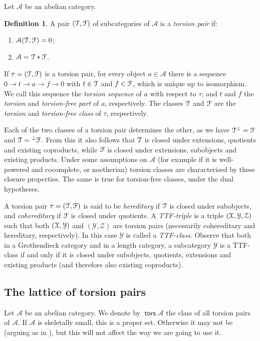 \documentclass[a4paper,11pt]{amsart}
\theoremstyle{plain}
\theoremstyle{definition}
\newtheorem{dfn}[thm]{Definition}
\newcommand{\Acal}{\mathcal{A}} \newcommand{\Bcal}{\mathcal{B}} \newcommand{\Ccal}{\mathcal{C}}
\newcommand{\Ycal}{\mathcal{Y}} \newcommand{\Zcal}{\mathcal{Z}}
\DeclareMathOperator{\tors}{\mathsf{tors}}
\begin{document}
Let $\Acal$ be an abelian category.

\begin{dfn}
	A pair $(\mathcal{T},\mathcal{F})$ of subcategories of $\Acal$ is a \emph{torsion pair} if:
	\begin{enumerate}
		\item $\Acal(\Tcal,\Fcal)=0$;
		\item $\Acal=\Tcal\ast\Fcal$.
	\end{enumerate}
\end{dfn}

If $\tau=(\mathcal{T},\mathcal{F})$ is a torsion pair, for every object $a\in\Acal$ there is a
sequence $0\to t\to a\to f\to 0$ with $t\in\mathcal{T}$ and $f\in\mathcal{F}$, which is
unique up to isomorphism. We call this sequence the \emph{torsion sequence} of
$a$ with respect to $\tau$, and $t$ and $f$ the \emph{torsion} and
\emph{torsion-free part} of $a$, respectively. The classes $\mathcal{T}$ and $\mathcal{F}$
are the \emph{torsion} and \emph{torsion-free class} of $\tau$, respectively.

Each of the two classes of a torsion pair determines the other, as we have
$\mathcal{T}^\bot=\mathcal{F}$ and $\mathcal{T}={}^\bot\mathcal{F}$. From this it also follows that
$\mathcal{T}$ is closed under extensions, quotients and existing coproducts, while
$\mathcal{F}$ is closed under extensions, subobjects and existing products. Under some
assumptions on $\Acal$ (for example if it is well-powered and cocomplete, or
noetherian) torsion classes are characterised by these closure properties. The
same is true for torsion-free classes, under the dual hypotheses.

A torsion pair $\tau=(\mathcal{T},\mathcal{F})$ is said to be \emph{hereditary} if $\mathcal{T}$
is closed under subobjects, and \emph{cohereditary} if $\mathcal{F}$ is closed under
quotients. A \emph{TTF-triple} is a triple $(\Xcal,\Ycal,\Zcal)$ such that both
$(\Xcal,\Ycal)$ and $(\Ycal,\Zcal)$ are torsion pairs (necessarily cohereditary
and hereditary, respectively). In this case $\Ycal$ is called a
\emph{TTF-class}. Observe that both in a Grothendieck category and in a length
category, a subcategory $\Ycal$ is a TTF-class if and only if it is closed under
subobjects, quotients, extensions and existing products (and therefore also
existing coproducts).

\subsection{The lattice of torsion pairs}\label{subsec:lattice}
Let $\Acal$ be an abelian category. We denote by $\tors{\Acal}$ the class of all
torsion pairs of $\Acal$. If $\Acal$ is skeletally small, this is a proper set.
Otherwise it may not be (arguing as in \cite[\S8]{stan-10}), but this will not affect the way we are going
to use it.
\end{document}
